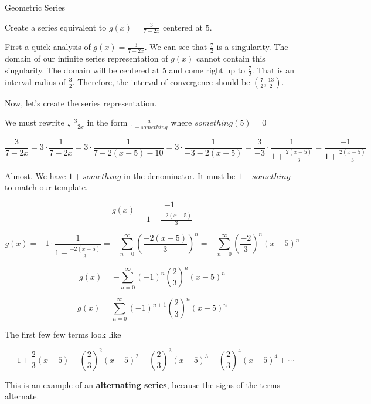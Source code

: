 \documentclass{ximera}
\begin{document}
\begin{example} Geometric Series



Create a series equivalent to $g(x)=\frac{3}{7 - 2x}$ centered at $5$.



\begin{explanation}


First a quick analysis of $g(x)=\frac{3}{7 - 2x}$.  We can see that $\frac{7}{2}$ is a singularity. The domain of our infinite series representation of $g(x)$ cannot contain this singularity.  The domain will be centered at $5$ and come right up to $\frac{7}{2}$.  That is an interval radius of $\frac{3}{2}$. Therefore, the interval of convergence should be $\left( \frac{7}{2}, \frac{13}{2} \right)$.

Now, let's create the series representation.

We must rewrite $\frac{3}{7 - 2x}$ in the form $\frac{a}{1-something}$ where $something(5) = 0$



\[      \frac{3}{7 - 2x}  = 3   \cdot \frac{1}{7 - 2x} =    3   \cdot \frac{1}{7 - 2(x-5) - 10} =   3   \cdot \frac{1}{-3 - 2(x-5)}   =   \frac{3}{-3}   \cdot \frac{1}{1 + \frac{2(x-5)}{3}}  = \frac{-1}{1 + \frac{2(x-5)}{3}}  \]



Almost.  We have $1 + something$ in the denominator. It must be $1 - something$ to match our template.


\[    g(x) =   \frac{-1}{1 - \frac{-2(x-5)}{3}}       \]

\[  g(x) =    -1 \cdot \frac{1}{1 - \frac{-2(x-5)}{3}}     =   -   \sum_{n=0}^{\infty}   \left( \frac{-2(x-5)}{3} \right)^n     =   -  \sum_{n=0}^{\infty}   \left( \frac{-2}{3} \right)^n  (x-5)^n\]


\[  g(x)     =   -  \sum_{n=0}^{\infty}   (-1)^n \left( \frac{2}{3} \right)^n  (x-5)^n    \]

\[  g(x)     =    \sum_{n=0}^{\infty}   (-1)^{n+1} \left( \frac{2}{3} \right)^n  (x-5)^n    \]

The first few few terms look like


\[   -1 + \frac{2}{3} (x-5) - \left( \frac{2}{3} \right)^2 (x-5)^2 +  \left( \frac{2}{3} \right)^3 (x-5)^3 - \left( \frac{2}{3} \right)^4 (x-5)^4    + \cdots   \]


This is an example of an \textbf{alternating series}, because the signs of the terms alternate. \\


\end{explanation}
\end{example}
\end{document}

